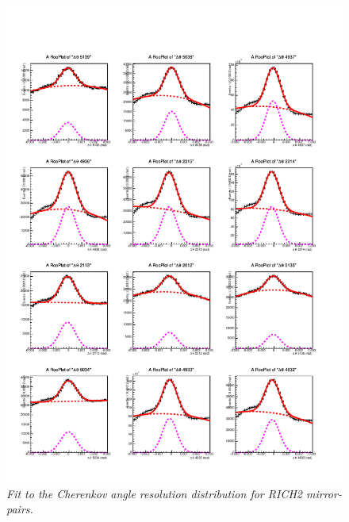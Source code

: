 \begin{figure}[!h]
	\vspace*{-0.cm}
	\begin{center}
		\includegraphics[width=1.\textwidth]{rich2_p2.pdf}
		\vspace*{-1.5cm}
	\end{center}
	\caption{\textit{Fit to the Cherenkov angle resolution distribution for RICH2 mirror-pairs.}}
	\label{fig:rich2p2}
\end{figure}
\clearpage

